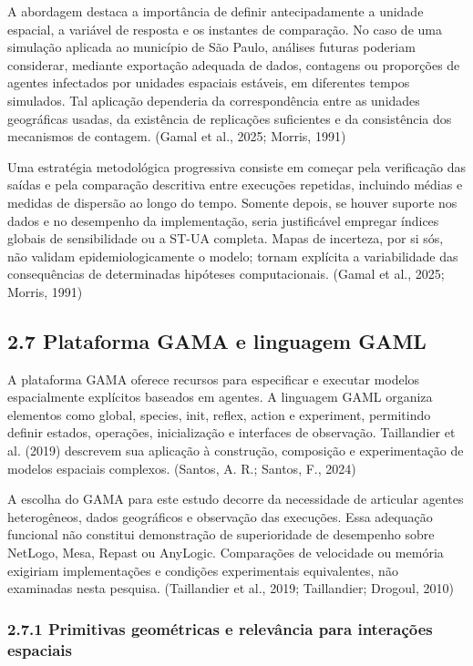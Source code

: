 A abordagem destaca a importância de definir antecipadamente a unidade
espacial, a variável de resposta e os instantes de comparação. No caso
de uma simulação aplicada ao município de São Paulo, análises futuras
poderiam considerar, mediante exportação adequada de dados, contagens ou
proporções de agentes infectados por unidades espaciais estáveis, em
diferentes tempos simulados. Tal aplicação dependeria da correspondência
entre as unidades geográficas usadas, da existência de replicações
suficientes e da consistência dos mecanismos de contagem. (Gamal et al.,
2025; Morris, 1991)

Uma estratégia metodológica progressiva consiste em começar pela
verificação das saídas e pela comparação descritiva entre execuções
repetidas, incluindo médias e medidas de dispersão ao longo do tempo.
Somente depois, se houver suporte nos dados e no desempenho da
implementação, seria justificável empregar índices globais de
sensibilidade ou a ST-UA completa. Mapas de incerteza, por si sós, não
validam epidemiologicamente o modelo; tornam explícita a variabilidade
das consequências de determinadas hipóteses computacionais. (Gamal et
al., 2025; Morris, 1991)

\subsection{2.7 Plataforma GAMA e linguagem
GAML}\label{plataforma-gama-e-linguagem-gaml}

A plataforma GAMA oferece recursos para especificar e executar modelos
espacialmente explícitos baseados em agentes. A linguagem GAML organiza
elementos como global, species, init, reflex, action e experiment,
permitindo definir estados, operações, inicialização e interfaces de
observação. Taillandier et al. (2019) descrevem sua aplicação à
construção, composição e experimentação de modelos espaciais complexos.
(Santos, A. R.; Santos, F., 2024)

A escolha do GAMA para este estudo decorre da necessidade de articular
agentes heterogêneos, dados geográficos e observação das execuções. Essa
adequação funcional não constitui demonstração de superioridade de
desempenho sobre NetLogo, Mesa, Repast ou AnyLogic. Comparações de
velocidade ou memória exigiriam implementações e condições experimentais
equivalentes, não examinadas nesta pesquisa. (Taillandier et al., 2019;
Taillandier; Drogoul, 2010)

\subsubsection{2.7.1 Primitivas geométricas e relevância para interações
espaciais}\label{primitivas-geomuxe9tricas-e-relevuxe2ncia-para-interauxe7uxf5es-espaciais}

